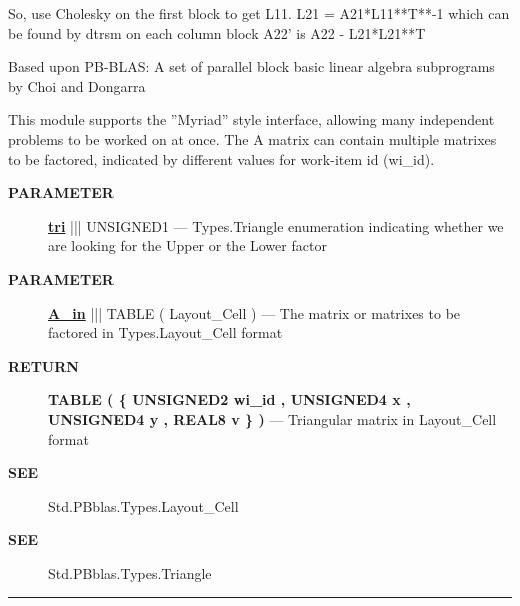  So, use Cholesky on the first block to get L11. L21 = A21*L11**T**-1 which can be found by dtrsm on each column block A22' is A22 - L21*L21**T 
\par
 Based upon PB-BLAS: A set of parallel block basic linear algebra subprograms by Choi and Dongarra 


\par
 This module supports the ''Myriad'' style interface, allowing many independent problems to be worked on at once. The A matrix can contain multiple matrixes to be factored, indicated by different values for work-item id (wi\_id).








\par
\begin{description}
\item [\colorbox{tagtype}{\color{white} \textbf{\textsf{PARAMETER}}}] \textbf{\underline{tri}} ||| UNSIGNED1 --- Types.Triangle enumeration indicating whether we are looking for the Upper or the Lower factor
\item [\colorbox{tagtype}{\color{white} \textbf{\textsf{PARAMETER}}}] \textbf{\underline{A\_in}} ||| TABLE ( Layout\_Cell ) --- The matrix or matrixes to be factored in Types.Layout\_Cell format
\end{description}







\par
\begin{description}
\item [\colorbox{tagtype}{\color{white} \textbf{\textsf{RETURN}}}] \textbf{TABLE ( \{ UNSIGNED2 wi\_id , UNSIGNED4 x , UNSIGNED4 y , REAL8 v \} )} --- Triangular matrix in Layout\_Cell format
\end{description}







\par
\begin{description}
\item [\colorbox{tagtype}{\color{white} \textbf{\textsf{SEE}}}] Std.PBblas.Types.Layout\_Cell
\item [\colorbox{tagtype}{\color{white} \textbf{\textsf{SEE}}}] Std.PBblas.Types.Triangle
\end{description}



\rule{\linewidth}{0.5pt}
